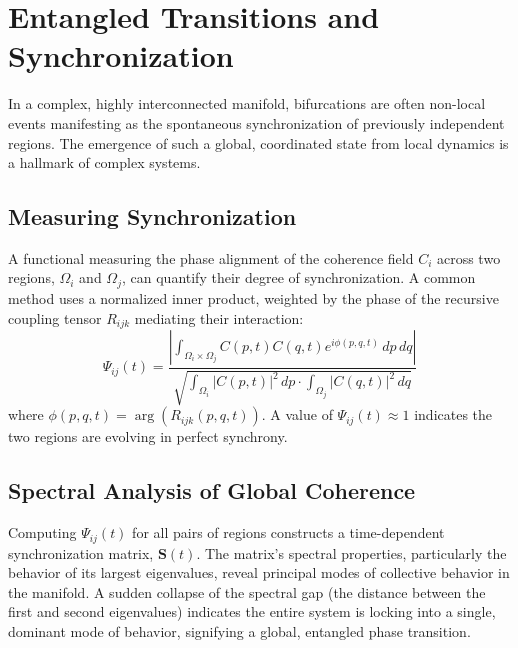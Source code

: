 \section{Entangled Transitions and Synchronization}

In a complex, highly interconnected manifold, bifurcations are often non-local events manifesting as the spontaneous synchronization of previously independent regions. The emergence of such a global, coordinated state from local dynamics is a hallmark of complex systems.

\subsection{Measuring Synchronization}

A functional measuring the phase alignment of the coherence field \(C_i\) across two regions, \(\Omega_i\) and \(\Omega_j\), can quantify their degree of synchronization. A common method uses a normalized inner product, weighted by the phase of the recursive coupling tensor \(R_{ijk}\) mediating their interaction:
\begin{equation}
\Psi_{ij}(t) = \frac{\left|\int_{\Omega_i \times \Omega_j} C(p,t)C(q,t)e^{i\phi(p,q,t)} \, dp \, dq\right|}{\sqrt{\int_{\Omega_i} |C(p,t)|^2 \, dp \cdot \int_{\Omega_j} |C(q,t)|^2 \, dq}}
\end{equation}
where \(\phi(p,q,t) = \arg(R_{ijk}(p,q,t))\). A value of \(\Psi_{ij}(t) \approx 1\) indicates the two regions are evolving in perfect synchrony.

\subsection{Spectral Analysis of Global Coherence}

Computing \(\Psi_{ij}(t)\) for all pairs of regions constructs a time-dependent synchronization matrix, \(\mathbf{S}(t)\). The matrix's spectral properties, particularly the behavior of its largest eigenvalues, reveal principal modes of collective behavior in the manifold. A sudden collapse of the spectral gap (the distance between the first and second eigenvalues) indicates the entire system is locking into a single, dominant mode of behavior, signifying a global, entangled phase transition. 